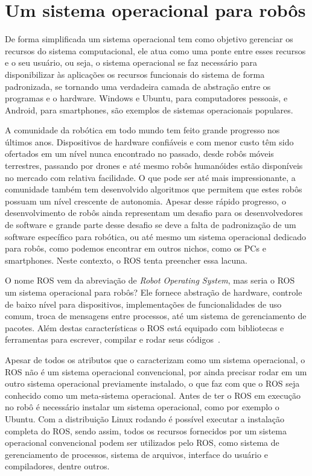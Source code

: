 \section{Um sistema operacional para robôs}

De forma simplificada um sistema operacional tem como objetivo gerenciar os recursos do sistema computacional, ele atua como uma ponte entre esses recursos e o seu usuário, ou seja, o sistema operacional se faz necessário para disponibilizar às aplicações os recursos funcionais do sistema de forma padronizada, se tornando uma verdadeira camada de abstração entre os programas e o hardware. Windows e Ubuntu, para computadores pessoais, e Android, para smartphones, são exemplos de sistemas operacionais populares.

A comunidade da robótica em todo mundo tem feito grande progresso nos últimos anos. Dispositivos de hardware confiáveis e com menor custo têm sido ofertados em um nível nunca encontrado no passado, desde robôs móveis terrestres, passando por drones e até mesmo robôs humanóides estão disponíveis no mercado com relativa facilidade. O que pode ser até mais impressionante, a comunidade também tem desenvolvido algoritmos que permitem que estes robôs possuam um nível crescente de autonomia. Apesar desse rápido progresso, o desenvolvimento de robôs ainda representam um desafio para os desenvolvedores de software e grande parte desse desafio se deve a falta de padronização de um software específico para robótica, ou até mesmo um sistema operacional dedicado para robôs, como podemos encontrar em outros nichos, como os PCs e smartphones. Neste contexto, o ROS tenta preencher essa lacuna.

O nome ROS vem da abreviação de \textit{Robot Operating System}, mas seria o ROS um sistema operacional para robôs? Ele fornece abstração de hardware, controle de baixo nível para dispositivos, implementações de funcionalidades de uso comum, troca de mensagens entre processos, até um sistema de gerenciamento de pacotes. Além destas características o ROS está equipado com bibliotecas e ferramentas para escrever, compilar e rodar seus códigos~\cite{RosIntro}.

Apesar de todos os atributos que o caracterizam como um sistema operacional, o ROS não é um sistema operacional convencional, por ainda precisar rodar em um outro sistema operacional previamente instalado, o que faz com que o ROS seja conhecido como um meta-sistema operacional. Antes de ter o ROS em execução no robô é necessário instalar um sistema operacional, como por exemplo o Ubuntu. Com a distribuição Linux rodando é possível executar a instalação completa do ROS, sendo assim, todos os recursos fornecidos por um sistema operacional convencional podem ser utilizados pelo ROS, como sistema de gerenciamento de processos, sistema de arquivos, interface do usuário e compiladores, dentre outros. 

